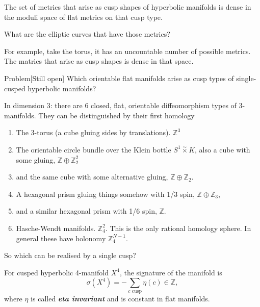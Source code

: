 \begin{thm}[Nimershwin, 90's]\leavevmode
The set of metrics that arise as cusp shapes of hyperbolic manifolds is dense in the moduli space of flat metrics on that cusp type.
\end{thm}

\begin{question}[Misha]\leavevmode
What are the elliptic curves that have those metrics?
\end{question}

\begin{remark}\leavevmode
	For example, take the torus, it has an uncountable number of possible metrics. The matrics that arise as cusp shapes is dense in that space.
\end{remark}

\begin{thing4}{Problem}[Still open]\leavevmode
	Which orientable flat manifolds arise as cusp types of single-cusped hyperbolic manifolds?
\end{thing4}

In dimension 3: there are 6 closed, flat, orientable diffeomorphism types of 3-manifolds. They can be distinguished by their first homology
\begin{enumerate}
\item The 3-torus (a cube gluing sides by translations). $\mathbb{Z}^3$
\item The orientable circle bundle over the Klein bottle $S^1\overset{\sim}{\times}K$, also a cube with some gluing, $\mathbb{Z}\oplus  \mathbb{Z}^2_2$
\item  and the same cube with some alternative gluing, $\mathbb{Z} \oplus  \mathbb{Z}_2$.
\item A hexagonal prism gluing things somehow with 1/3 spin, $\mathbb{Z}\oplus \mathbb{Z}_3$,
\item and a similar hexagonal prism with 1/6 spin, $\mathbb{Z}$.
\item  Hasche-Wendt manifolds. $\mathbb{Z}^2_4$. This is the only rational homology sphere. In general these have holonomy $\mathbb{Z}_4^{N-1}$.
\end{enumerate}

So which can be realised by a single cusp?

\begin{thm}\leavevmode
For cusped hyperbolic 4-manifold $X^4$, the signature of the manifold is
\[\sigma(X^4)=-\sum_{c \text{ cusp} }\eta(c)\in\mathbb{Z},\]
where $\eta$ is called \textit{\textbf{eta invariant}} and is constant in flat manifolds.
\end{thm}

